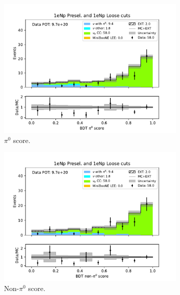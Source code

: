\begin{figure}[H]
    \centering
    \begin{subfigure}{0.5\linewidth}
        \includegraphics[width=\linewidth]{technote/Sidebands/Figures/ShowerEnergySideband/shr_energy_sideband_pi0_score_run1234b4c4d_NP_NPL.pdf}%
        \caption{$\pi^0$ score.}
    \end{subfigure}%
    \begin{subfigure}{0.5\linewidth}
        \includegraphics[width=\linewidth]{technote/Sidebands/Figures/ShowerEnergySideband/shr_energy_sideband_nonpi0_score_run1234b4c4d_NP_NPL.pdf}%
        \caption{Non-$\pi^0$ score.}
    \end{subfigure}
    \begin{subfigure}{0.5\linewidth}

\end{subfigure}
\end{figure}
